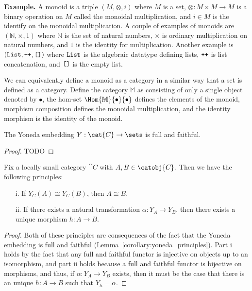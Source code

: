 \textbf{Example.} A monoid is a triple $(M, \otimes, i)$ where $M$ is
a set, $\otimes : M \times M \to M$ is a binary operation on $M$
called the monoidal multiplication, and $i \in M$ is the identify on
the monoidal multiplication.  A couple of examples of monoids are
$(\mathbb{N}, \times, 1)$ where $\mathbb{N}$ is the set of natural
numbers, $\times$ is ordinary multiplication on natural numbers, and
$1$ is the identity for multiplication.  Another example is
$(\verb!List!, \verb!++!, \verb![]!)$ where $\verb!List!$ is the
algebraic datatype defining lists, $\verb!++!$ is list concatenation,
and $\verb![]!$ is the empty list.

We can equivalently define a monoid as a category in a similar way
that a set is defined as a category.  Define the category $\mathbb{M}$
as consisting of only a single object denoted by $\bullet$, the
hom-set $\Hom{\mathbb{M}}{\bullet}{\bullet}$ defines the elements of the monoid,
morphism composition defines the monoidal multiplication, and the
identity morphism is the identity of the monoid.

\begin{lemma}
  \label{lemma:full_and_faithful}
  The Yoneda embedding $Y : \cat{C} \to \sets$ is full and
  faithful.
\end{lemma}
\begin{proof}
  TODO
\end{proof}

\begin{corollary}
  \label{corollary:yoneda_principles}
  Fix a locally small category $\cat{C}$ with $A , B \in \catobj{C}$.
  Then we have the following principles:
  \begin{itemize}
  \item[i.] If $Y_C(A) \cong Y_C(B)$, then $A \cong B$.
  \item[ii.] If there exists a natural transformation $\alpha : Y_A
    \to Y_B$, then there exists a unique morphism $h : A \to B$.
  \end{itemize}
\end{corollary}
\begin{proof}
  Both of these principles are consequences of the fact that the
  Yoneda embedding is full and faithful
  (Lemma~\ref{corollary:yoneda_principles}).  Part i holds by the fact
  that any full and faithful functor is injective on objects up to an
  isomorphism, and part ii holds because a full and faithful functor
  is bijective on morphisms, and thus, if $\alpha : Y_A \to Y_B$
  exists, then it must be the case that there is an unique $h : A \to
  B$ such that $Y_h = \alpha$.
\end{proof}

